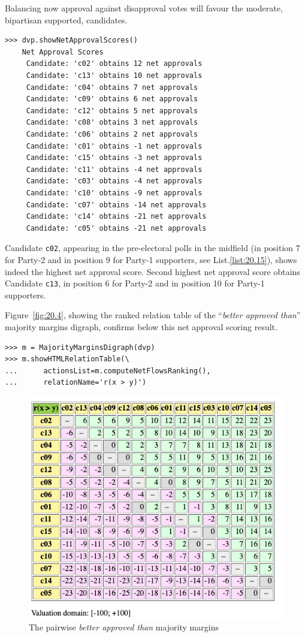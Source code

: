 Balancing now approval against disapproval votes will favour the moderate, bipartisan supported, candidates.
\begin{lstlisting}
>>> dvp.showNetApprovalScores()
    Net Approval Scores
     Candidate: 'c02' obtains 12 net approvals
     Candidate: 'c13' obtains 10 net approvals
     Candidate: 'c04' obtains 7 net approvals
     Candidate: 'c09' obtains 6 net approvals
     Candidate: 'c12' obtains 5 net approvals
     Candidate: 'c08' obtains 3 net approvals
     Candidate: 'c06' obtains 2 net approvals
     Candidate: 'c01' obtains -1 net approvals
     Candidate: 'c15' obtains -3 net approvals
     Candidate: 'c11' obtains -4 net approvals
     Candidate: 'c03' obtains -4 net approvals
     Candidate: 'c10' obtains -9 net approvals
     Candidate: 'c07' obtains -14 net approvals
     Candidate: 'c14' obtains -21 net approvals
     Candidate: 'c05' obtains -21 net approvals
\end{lstlisting}

Candidate \texttt{c02}, appearing in the pre-electoral polls in the midfield (in position 7 for Party-2 and in position 9 for Party-1 supporters, see List.\vref{list:20.15}), shows indeed the highest net approval score. Second highest net approval score obtains Candidate \texttt{c13}, in  position 6 for Party-2 and in position 10 for Party-1 supporters.

Figure~\vref{fig:20.4}, showing the \NetFlows ranked relation table of the ``\emph{better approved than}'' majority margins digraph, confirms below this net approval scoring result.
\begin{lstlisting}
>>> m = MajorityMarginsDigraph(dvp)
>>> m.showHTMLRelationTable(\
...      actionsList=m.computeNetFlowsRanking(),
...      relationName='r(x > y)')
\end{lstlisting}	   
\begin{figure}[ht]
\includegraphics[width=0.8\hsize]{Figures/20-4-majMargDAV.png}
\caption{The pairwise \emph{better approved than} majority margins} 
\label{fig:20.4}       %
\end{figure}

